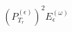 \documentclass[preview]{standalone}
\begin{document}
\begin{align*}
(P_{T_r}^{(\epsilon)})^2E_{\epsilon}^{(\omega)}
\end{align*}
\end{document}

